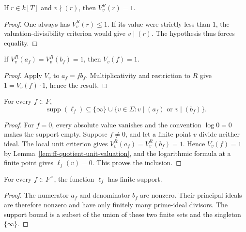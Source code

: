 \begin{lemma}\label{lem:ff-local-unit-criterion}
\leanok
{}
If $r\in k[T]$ and $v\nmid(r)$, then $V_v^R(r)=1$.
\end{lemma}
\begin{proof}
One always has $V_v^R(r)\leq1$. If its value were strictly less than
$1$, the valuation-divisibility criterion would give $v\mid(r)$.
The hypothesis thus forces equality.
\end{proof}

\begin{lemma}\label{lem:ff-quotient-unit-valuation}
\leanok
{}
If $V_v^R(a_f)=V_v^R(b_f)=1$, then $V_v(f)=1$.
\end{lemma}
\begin{proof}
Apply $V_v$ to $a_f=f b_f$. Multiplicativity and restriction to $R$
give $1=V_v(f)\cdot1$, hence the result.
\end{proof}

\begin{lemma}\label{lem:ff-support-bound}
\leanok
{}
For every $f\in F$,
\[
 \operatorname{supp}(\ell_f)\subseteq
 \{\infty\}\cup\{v\in\Sigma:v\mid(a_f)\text{ or }v\mid(b_f)\}.
\]
\end{lemma}
\begin{proof}
For $f=0$, every absolute value vanishes and the convention $\log0=0$
makes the support empty. Suppose $f\ne0$, and let a finite point $v$
divide neither ideal. The local unit criterion gives
$V_v^R(a_f)=V_v^R(b_f)=1$. Hence $V_v(f)=1$ by
Lemma~\ref{lem:ff-quotient-unit-valuation}, and the logarithmic formula
at a finite point gives $\ell_f(v)=0$. This proves the inclusion.
\end{proof}

\begin{lemma}\label{lem:ff-finite-log-support}
\leanok
{}
For every $f\in F^\times$, the function $\ell_f$ has finite support.
\end{lemma}
\begin{proof}
The numerator $a_f$ and denominator $b_f$ are nonzero. Their principal
ideals are therefore nonzero and have only finitely many prime-ideal
divisors. The support bound is a subset of the union of these two finite
sets and the singleton $\{\infty\}$.
\end{proof}

